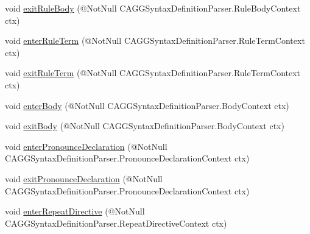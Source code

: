 \begin{DoxyCompactItemize}
\item 
void \hyperlink{interfaceit_1_1emarolab_1_1cagg_1_1core_1_1language_1_1parser_1_1ANTLRInterface_1_1ANTLRGenerate8f089aac366bd2683be460c907cc6185_a636afcf1cd7ef19d79d297ca73d44847}{exit\-Rule\-Body} (@Not\-Null C\-A\-G\-G\-Syntax\-Definition\-Parser.\-Rule\-Body\-Context ctx)
\item 
void \hyperlink{interfaceit_1_1emarolab_1_1cagg_1_1core_1_1language_1_1parser_1_1ANTLRInterface_1_1ANTLRGenerate8f089aac366bd2683be460c907cc6185_ae6a890d9976a8beb634fe79d0c044c9b}{enter\-Rule\-Term} (@Not\-Null C\-A\-G\-G\-Syntax\-Definition\-Parser.\-Rule\-Term\-Context ctx)
\item 
void \hyperlink{interfaceit_1_1emarolab_1_1cagg_1_1core_1_1language_1_1parser_1_1ANTLRInterface_1_1ANTLRGenerate8f089aac366bd2683be460c907cc6185_a7b662de3bc88e02201d28b963d121f5d}{exit\-Rule\-Term} (@Not\-Null C\-A\-G\-G\-Syntax\-Definition\-Parser.\-Rule\-Term\-Context ctx)
\item 
void \hyperlink{interfaceit_1_1emarolab_1_1cagg_1_1core_1_1language_1_1parser_1_1ANTLRInterface_1_1ANTLRGenerate8f089aac366bd2683be460c907cc6185_a30942cc635645aecc73c2675d40c56b4}{enter\-Body} (@Not\-Null C\-A\-G\-G\-Syntax\-Definition\-Parser.\-Body\-Context ctx)
\item 
void \hyperlink{interfaceit_1_1emarolab_1_1cagg_1_1core_1_1language_1_1parser_1_1ANTLRInterface_1_1ANTLRGenerate8f089aac366bd2683be460c907cc6185_a9ba942a41ce763488223aebf644d1e60}{exit\-Body} (@Not\-Null C\-A\-G\-G\-Syntax\-Definition\-Parser.\-Body\-Context ctx)
\item 
void \hyperlink{interfaceit_1_1emarolab_1_1cagg_1_1core_1_1language_1_1parser_1_1ANTLRInterface_1_1ANTLRGenerate8f089aac366bd2683be460c907cc6185_a1331e70aa91c6c01fa42f0fecfdeec1d}{enter\-Pronounce\-Declaration} (@Not\-Null C\-A\-G\-G\-Syntax\-Definition\-Parser.\-Pronounce\-Declaration\-Context ctx)
\item 
void \hyperlink{interfaceit_1_1emarolab_1_1cagg_1_1core_1_1language_1_1parser_1_1ANTLRInterface_1_1ANTLRGenerate8f089aac366bd2683be460c907cc6185_a30fabb652323dd98a08d19bfce7b7112}{exit\-Pronounce\-Declaration} (@Not\-Null C\-A\-G\-G\-Syntax\-Definition\-Parser.\-Pronounce\-Declaration\-Context ctx)
\item 
void \hyperlink{interfaceit_1_1emarolab_1_1cagg_1_1core_1_1language_1_1parser_1_1ANTLRInterface_1_1ANTLRGenerate8f089aac366bd2683be460c907cc6185_ab9b032d6bd6decc78b9084889df7230a}{enter\-Repeat\-Directive} (@Not\-Null C\-A\-G\-G\-Syntax\-Definition\-Parser.\-Repeat\-Directive\-Context ctx)

\end{DoxyCompactItemize}
